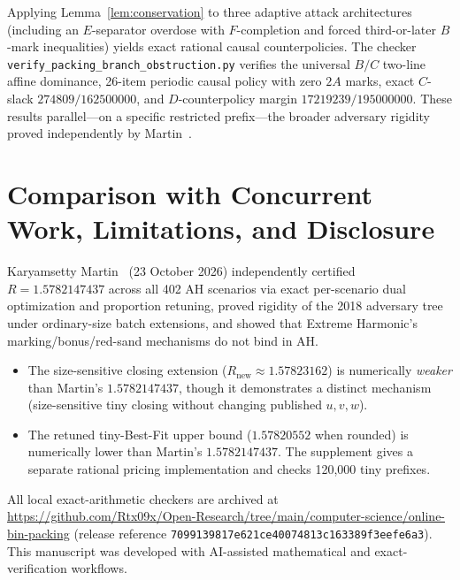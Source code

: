 \documentclass[11pt,letterpaper]{article}
\theoremstyle{definition}
\theoremstyle{remark}
\begin{document}
Applying Lemma~\ref{lem:conservation} to three adaptive attack architectures (including an $E$-separator overdose with $F$-completion and forced third-or-later $B$-mark inequalities) yields exact rational causal counterpolicies. The checker \texttt{verify\_packing\_branch\_obstruction.py} verifies the universal $B/C$ two-line affine dominance, 26-item periodic causal policy with zero $2A$ marks, exact $C$-slack $274809/162500000$, and $D$-counterpolicy margin $17219239/195000000$. These results parallel—on a specific restricted prefix—the broader adversary rigidity proved independently by Martin~\cite{Martin2026}.

\section{Comparison with Concurrent Work, Limitations, and Disclosure}
Karyamsetty Martin~\cite{Martin2026} (23 October 2026) independently certified $R = 1.5782147437$ across all 402 AH scenarios via exact per-scenario dual optimization and proportion retuning, proved rigidity of the 2018 adversary tree under ordinary-size batch extensions, and showed that Extreme Harmonic's marking/bonus/red-sand mechanisms do not bind in AH.
\begin{itemize}
  \item The size-sensitive closing extension ($R_{\mathrm{new}} \approx 1.57823162$) is numerically \emph{weaker} than Martin's $1.5782147437$, though it demonstrates a distinct mechanism (size-sensitive tiny closing without changing published $u,v,w$).
  \item The retuned tiny-Best-Fit upper bound ($1.57820552$ when rounded) is numerically lower than Martin's $1.5782147437$. The supplement gives a separate rational pricing implementation and checks 120,000 tiny prefixes.
\end{itemize}
All local exact-arithmetic checkers are archived at \url{https://github.com/Rtx09x/Open-Research/tree/main/computer-science/online-bin-packing} (release reference \texttt{7099139817e621ce40074813c163389f3eefe6a3}). This manuscript was developed with AI-assisted mathematical and exact-verification workflows.



\end{document}
